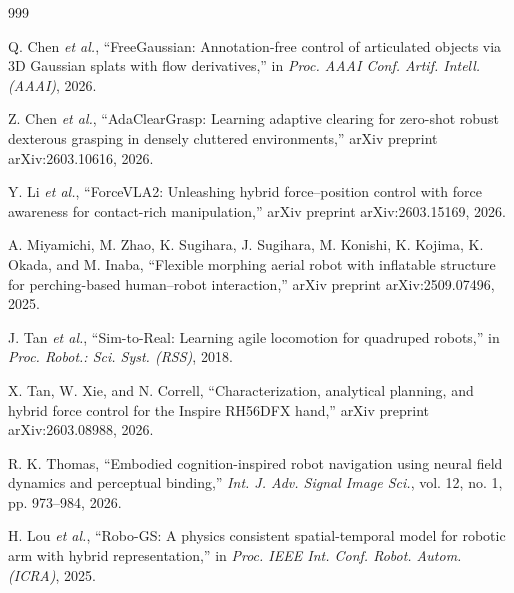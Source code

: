 \documentclass[11pt,a4paper]{article}
\begin{document}
\begin{thebibliography}{999}

Q. Chen \textit{et al.}, ``{FreeGaussian}: Annotation-free control of articulated objects via {3D} Gaussian splats with flow derivatives,'' in \textit{Proc. AAAI Conf. Artif. Intell. (AAAI)}, 2026.




Z. Chen \textit{et al.}, ``{AdaClearGrasp}: Learning adaptive clearing for zero-shot robust dexterous grasping in densely cluttered environments,'' arXiv preprint arXiv:2603.10616, 2026.




Y. Li \textit{et al.}, ``{ForceVLA}2: Unleashing hybrid force--position control with force awareness for contact-rich manipulation,'' arXiv preprint arXiv:2603.15169, 2026.




A. Miyamichi, M. Zhao, K. Sugihara, J. Sugihara, M. Konishi, K. Kojima, K. Okada, and M. Inaba, ``Flexible morphing aerial robot with inflatable structure for perching-based human--robot interaction,'' arXiv preprint arXiv:2509.07496, 2025.




J. Tan \textit{et al.}, ``{Sim-to-Real}: Learning agile locomotion for quadruped robots,'' in \textit{Proc. Robot.: Sci. Syst. (RSS)}, 2018.




X. Tan, W. Xie, and N. Correll, ``Characterization, analytical planning, and hybrid force control for the Inspire {RH}56{DFX} hand,'' arXiv preprint arXiv:2603.08988, 2026.




R. K. Thomas, ``Embodied cognition-inspired robot navigation using neural field dynamics and perceptual binding,'' \textit{Int. J. Adv. Signal Image Sci.}, vol. 12, no. 1, pp. 973--984, 2026.




H. Lou \textit{et al.}, ``{Robo-GS}: A physics consistent spatial-temporal model for robotic arm with hybrid representation,'' in \textit{Proc. IEEE Int. Conf. Robot. Autom. (ICRA)}, 2025.




\end{thebibliography}
\end{document}
